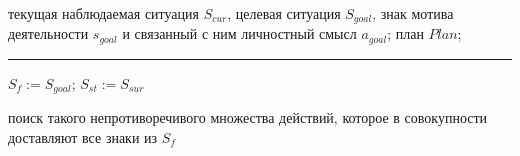 	\Require текущая наблюдаемая ситуация $S_{cur}$, целевая ситуация $S_{goal}$, знак мотива деятельности $s_{goal}$ и связанный с ним личностный смысл $a_{goal}$;
	\Ensure план $Plan$;
	
	\vspace*{1pt}
	\hrule
	\vspace*{5pt}
	
	\State $S_f := S_{goal}$;
	\State $S_{st} := S_{sur}$
	
	\State поиск такого непротиворечивого множества действий, которое в совокупности доставляют все знаки из $S_f$

